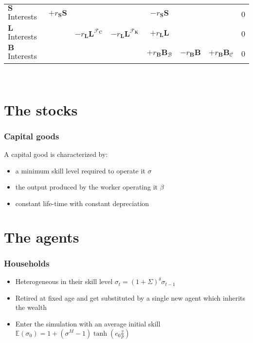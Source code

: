 \documentclass[]{beamer}
\begin{document}
\begin{frame}
{\begin{tabularx}{\textwidth}{@{} Y|cccccc|l @{}}
			\midrule
			$\mathbf{S}$ Interests & $+r_{\mathbf{S}} \mathbf{S}$             &                                                         &                                                                        & $-r_{\mathbf{S}} \mathbf{S}$           &                                          &                                        & 0    \\
			$\mathbf{L}$ Interests &                                          & $-r_{\mathbf{L}} \mathbf{L}^{\mathcal{F}_{\mathbf{C}}}$ & $-r_{\mathbf{L}} \mathbf{L}^{\mathcal{F}_{\mathbf{K}}}$                & $+r_{\mathbf{L}} \mathbf{L}$           &                                          &                                        & 0    \\
			$\mathbf{B}$ Interests &                                          &                                                         &                                                                        & $+r_\mathbf{B} \mathbf{B}_\mathcal{B}$ & $-r_\mathbf{B} \mathbf{B}$               & $+r_\mathbf{B} \mathbf{B}_\mathcal{C}$ & 0    \\
			\bottomrule
		\end{tabularx}
	}\\
\end{frame}

\section{The stocks}
\begin{frame}
	\frametitle{Capital goods}
	A capital good is characterized by:
	\begin{itemize}
		\item a minimum skill level required to operate it $\sigma$
		\item the output produced by the worker operating it $\beta$
		\item constant life-time with constant depreciation
	\end{itemize}
\end{frame}

\section{The agents}
\begin{frame}
	\frametitle{Households}
	\begin{itemize}
		\item Heterogeneous in their skill level $\sigma_t = (1+\Sigma)^\delta \sigma_{t-1}$
		\item Retired at fixed age and get substituted by a single new agent which inherits the wealth
		\item Enter the simulation with an average initial skill $\mathbb{E}(\sigma_0) = 1+(\sigma^M-1)\tanh(e_0 \frac{v}{p})$
	\end{itemize}
\end{frame}
\end{document}
